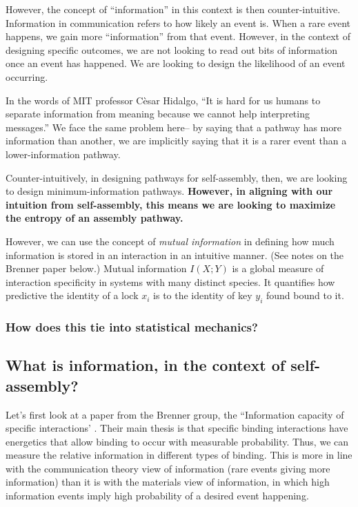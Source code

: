 However, the concept of ``information'' in this context is then counter-intuitive.
Information in communication refers to how likely an event is.
When a rare event happens, we gain more ``information'' from that event.
However, in the context of designing specific outcomes, we are not looking to read out bits of information once an event has happened.
We are looking to design the likelihood of an event occurring.


In the words of MIT professor C\`{e}sar Hidalgo, ``It is hard for us humans to separate information from meaning because we cannot help interpreting messages.'' 
We face the same problem here-- by saying that a pathway has more information than another, we are implicitly saying that it is a rarer event than a lower-information pathway.

Counter-intuitively, in designing pathways for self-assembly, then, we are looking to design minimum-information pathways.
\textbf{However, in aligning with our intuition from self-assembly, this means we are looking to maximize the entropy of an assembly pathway.}

However, we can use the concept of \textit{mutual information} in defining how much information is stored in an interaction in an intuitive manner.
(See notes on the Brenner paper below.)
Mutual information $I(X;Y)$ is a global measure of interaction specificity in systems with many distinct species.
It quantifies how predictive the identity of a lock $x_i$ is to the identity of key $y_i$ found bound to it.

\subsubsection{How does this tie into statistical mechanics?}


\subsection{What is information, in the context of self-assembly?}

Let's first look at a paper from the Brenner group, the ``Information capacity of specific interactions' \cite{Huntley_2016_PNAS}.
Their main thesis is that specific binding interactions have energetics that allow binding to occur with measurable probability.
Thus, we can measure the relative information in different types of binding.
This is more in line with the communication theory view of information (rare events giving more information) than it is with the materials view of information, in which high information events imply high probability of a desired event happening.


